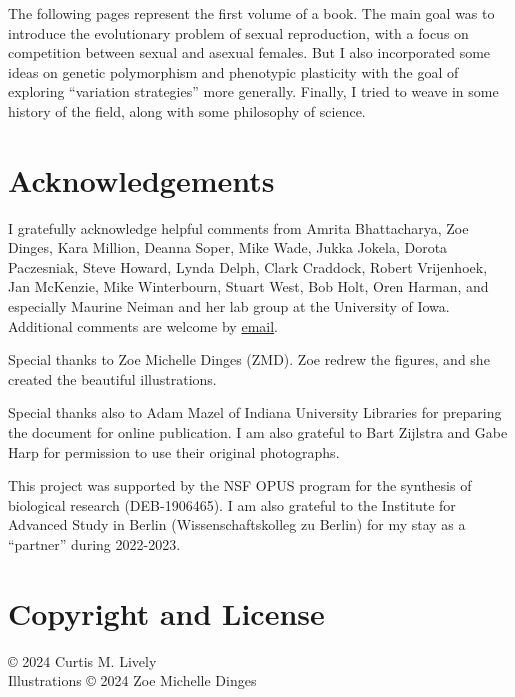 \documentclass[
  letterpaper,
]{book}
\begin{document}

The following pages represent the first volume of a book. The main goal
was to introduce the evolutionary problem of sexual reproduction, with a
focus on competition between sexual and asexual females. But I also
incorporated some ideas on genetic polymorphism and phenotypic
plasticity with the goal of exploring ``variation strategies'' more
generally. Finally, I tried to weave in some history of the field, along
with some philosophy of science.

\section*{Acknowledgements}\label{acknowledgements}


I gratefully acknowledge helpful comments from Amrita Bhattacharya, Zoe
Dinges, Kara Million, Deanna Soper, Mike Wade, Jukka Jokela, Dorota
Paczesniak, Steve Howard, Lynda Delph, Clark Craddock, Robert
Vrijenhoek, Jan McKenzie, Mike Winterbourn, Stuart West, Bob Holt, Oren
Harman, and especially Maurine Neiman and her lab group at the
University of Iowa. Additional comments are welcome by
\href{mailto:clively@indiana.edu}{email}.

Special thanks to Zoe Michelle Dinges (ZMD). Zoe redrew the figures, and
she created the beautiful illustrations.

Special thanks also to Adam Mazel of Indiana University Libraries for
preparing the document for online publication. I am also grateful to
Bart Zijlstra and Gabe Harp for permission to use their original
photographs.

This project was supported by the NSF OPUS program for the synthesis of
biological research (DEB-1906465). I am also grateful to the Institute
for Advanced Study in Berlin (Wissenschaftskolleg zu Berlin) for my stay
as a ``partner'' during 2022-2023.

\section*{Copyright and License}\label{copyright-and-license}


© 2024 Curtis M. Lively\\
Illustrations © 2024 Zoe Michelle Dinges
\end{document}
